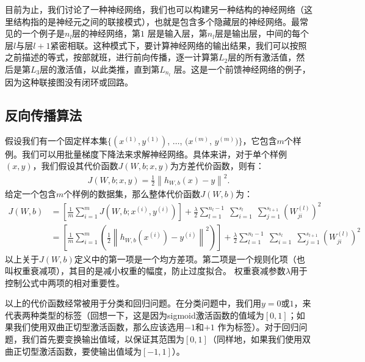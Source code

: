 目前为止，我们讨论了一种神经网络，我们也可以构建另一种结构的神经网络（这里结构指的是神经元之间的联接模式），也就是包含多个隐藏层的神经网络。最常见的一个例子是$n_l$层的神经网络，第$1$ 层是输入层，第$n_l$层是输出层，中间的每个层$l$与层$l+1$紧密相联。这种模式下，要计算神经网络的输出结果，我们可以按照之前描述的等式，按部就班，进行前向传播，逐一计算第$L_2$层的所有激活值，然后是第$L_3$层的激活值，以此类推，直到第$L_{n_l}$ 层。这是一个前馈神经网络的例子，因为这种联接图没有闭环或回路。\par

\subsection{反向传播算法}
假设我们有一个固定样本集$\{ (x^{(1)}, y^{(1)})$, $\ldots$, $(x^{(m)}$, $y^{(m)}) \}$，它包含$m$个样例。我们可以用批量梯度下降法来求解神经网络。具体来讲，对于单个样例$(x,y)$，我们假设其代价函数$J(W,b; x,y)$为方差代价函数，则有：
\begin{align}
	J(W,b; x,y) = \frac{1}{2} \left\| h_{W,b}(x) - y \right\|^2.
\end{align}
给定一个包含$m$个样例的数据集，那么整体代价函数$J(W,b)$为：
\begin{equation}
	\begin{aligned}
	J(W,b)
	&= \left[ \frac{1}{m} \sum_{i=1}^m J(W,b;x^{(i)},y^{(i)}) \right]
	+ \frac{\lambda}{2} \sum_{l=1}^{n_l-1} \; \sum_{i=1}^{s_l} \; \sum_{j=1}^{s_{l+1}} \left( W^{(l)}_{ji} \right)^2
	\\
	&= \left[ \frac{1}{m} \sum_{i=1}^m \left( \frac{1}{2} \left\| h_{W,b}(x^{(i)}) - y^{(i)} \right\|^2 \right) \right]
	+ \frac{\lambda}{2} \sum_{l=1}^{n_l-1} \; \sum_{i=1}^{s_l} \; \sum_{j=1}^{s_{l+1}} \left( W^{(l)}_{ji} \right)^2
	\end{aligned}
\end{equation}
以上关于$J(W,b)$定义中的第一项是一个均方差项。第二项是一个规则化项（也叫权重衰减项），其目的是减小权重的幅度，防止过度拟合。
权重衰减参数$\lambda$用于控制公式中两项的相对重要性。

以上的代价函数经常被用于分类和回归问题。在分类问题中，我们用$y=0$或$1$，来代表两种类型的标签（回想一下，这是因为sigmoid激活函数的值域为$[0,1]$；如果我们使用双曲正切型激活函数，那么应该选用$-1$和$+1$ 作为标签）。对于回归问题，我们首先要变换输出值域，以保证其范围为$[0,1]$（同样地，如果我们使用双曲正切型激活函数，要使输出值域为$[-1,1]$）。\par

